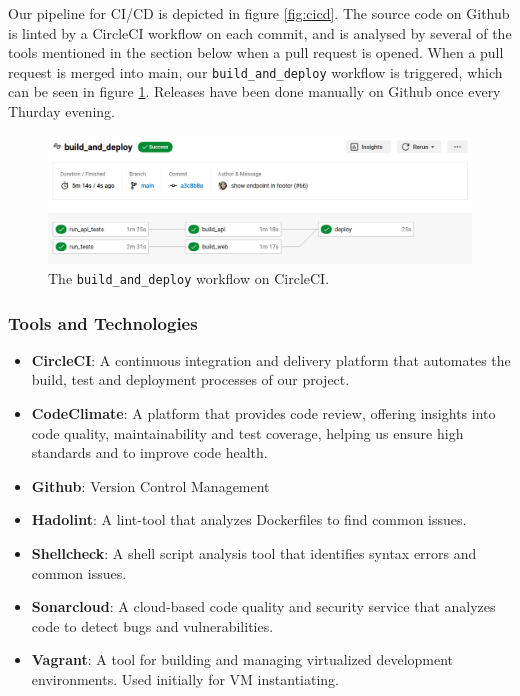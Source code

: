 Our pipeline for CI/CD is depicted in figure \ref{fig:cicd}. The source code on Github is linted by a CircleCI workflow on each commit, and is analysed by several of the tools mentioned in the section below when a pull request is opened. When a pull request is merged into main, our \texttt{build\_and\_deploy} workflow is triggered, which can be seen in figure \ref{fig:build_and_deploy}. Releases have been done manually on Github once every Thurday evening.



\begin{figure}[H]
    \centering
    \includegraphics[width=\textwidth]{images/pipeline.png}
    \caption{The \texttt{build\_and\_deploy} workflow on CircleCI.}
    \label{fig:build_and_deploy}
\end{figure}

\subsubsection*{Tools and Technologies}
\begin{multicols}{2}
    \begin{itemize}
        \item \textbf{CircleCI}: A continuous integration and delivery platform that automates the build, test and deployment processes of our project. 
        \item \textbf{CodeClimate}: A platform that provides code review, offering insights into code quality, maintainability and test coverage, helping us ensure high standards and to improve code health.
        \item \textbf{Github}: Version Control Management
        \item \textbf{Hadolint}: A lint-tool that analyzes Dockerfiles to find common issues.
        \item \textbf{Shellcheck}: A shell script analysis tool that identifies syntax errors and common issues.
        \item \textbf{Sonarcloud}: A cloud-based code quality and security service that analyzes code to detect bugs and vulnerabilities.
        \item \textbf{Vagrant}: A tool for building and managing virtualized development environments. Used initially for VM instantiating.
    \end{itemize}
\end{multicols}

